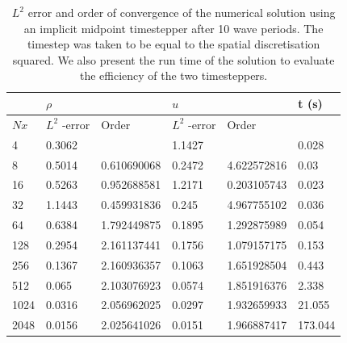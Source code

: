 \documentclass[a4paper,11pt]{article}
\begin{document}
\begin{table}[]
\centering
\caption{$L^2$ error and order of convergence of the numerical solution using an implicit midpoint timestepper after 10 wave periods. The timestep was taken to be equal to the spatial discretisation squared. We also present the run time of the solution to evaluate the efficiency of the two timesteppers. }
\label{midpointerror}
\begin{tabular}{@{}llllll@{}}
\toprule
     & \multicolumn{2}{l}{$\rho$} & \multicolumn{2}{l}{$u$}    & t (s)   \\ \midrule
   
$Nx$ & $L^2$ -error & Order       & $L^2$ -error & Order       &         \\
  \toprule
4    & 0.3062       &             & 1.1427       &             & 0.028   \\
8    & 0.5014       & 0.610690068 & 0.2472       & 4.622572816 & 0.03    \\
16   & 0.5263       & 0.952688581 & 1.2171       & 0.203105743 & 0.023   \\
32   & 1.1443       & 0.459931836 & 0.245        & 4.967755102 & 0.036   \\
64   & 0.6384       & 1.792449875 & 0.1895       & 1.292875989 & 0.054   \\
128  & 0.2954       & 2.161137441 & 0.1756       & 1.079157175 & 0.153   \\
256  & 0.1367       & 2.160936357 & 0.1063       & 1.651928504 & 0.443   \\
512  & 0.065        & 2.103076923 & 0.0574       & 1.851916376 & 2.338   \\
1024 & 0.0316       & 2.056962025 & 0.0297       & 1.932659933 & 21.055  \\
2048 & 0.0156       & 2.025641026 & 0.0151       & 1.966887417 & 173.044 \\ \bottomrule
\end{tabular}
\end{table}
\end{document}
